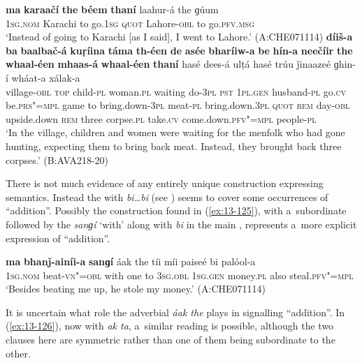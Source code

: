 \ea
\label{ex:13-123}
\gll \textbf{ma} \textbf{karaačí} \textbf{the} \textbf{béem} \textbf{thaní} laahur-á the  ɡúum \\
\textsc{1sg.nom} Karachi to go.\textsc{1sg} \textsc{quot} Lahore-\textsc{obl} to go.\textsc{pfv.msg} \\
\glt `Instead of going to Karachi [as I said], I went to Lahore.' (A:CHE071114)
\ex
\label{ex:13-124}
\gll \textbf{díiš-a} \textbf{ba} \textbf{baalbač-á} \textbf{kuṛíina} \textbf{táma} \textbf{th-éen} \textbf{de} \textbf{asée} \textbf{bharíiw-a} \textbf{be} \textbf{hín-a} \textbf{neečíir} \textbf{the} \textbf{whaal-éen} \textbf{mhaas-á} \textbf{whaal-éen} \textbf{thaní} hasé dees-á ulṭá hasé trúu ǰinaazeé ɡhin-í wháat-a xálak-a\\
village-\textsc{obl} \textsc{top} child-\textsc{pl} woman.\textsc{pl} waiting do-\textsc{3pl}
\textsc{pst} \textsc{1pl.gen} husband-\textsc{pl} go.\textsc{cv} be.\textsc{prs"=mpl} game to
bring.down-\textsc{3pl} meat-\textsc{pl} bring.down.\textsc{3pl} \textsc{quot} \textsc{rem} day-\textsc{obl} upside.down \textsc{rem} three corpse.\textsc{pl} take.\textsc{cv} come.down.\textsc{pfv"=mpl} people-\textsc{pl}\\
\glt `In the village, children and women were waiting for the menfolk who had gone hunting, expecting them to bring back meat. Instead, they brought back three corpses.' (B:AVA218-20) 
\z

 There is not much evidence of any entirely unique construction expressing  semantics. Instead the  with \textit{bi{\ldots}bi} (see ) seems to cover some occurrences of ``addition''. Possibly the construction found in (\ref{ex:13-125}), with a~subordinate  followed by the  \textit{sanɡí} `with' along with \textit{bi} in the main , represents a~more explicit expression of ``addition''. 

\begin{exe}
\ex
\label{ex:13-125}
\gll \textbf{ma} \textbf{bhanǰ-ainíi-a} \textbf{sanɡí} áak the tíi míi  paiseé bi palóol-a \\
\textsc{1sg.nom} beat-\textsc{vn"=obl} with one to \textsc{3sg.obl} \textsc{1sg.gen} money.\textsc{pl}  also steal.\textsc{pfv"=mpl} \\
\glt `Besides beating me up, he stole my money.' (A:CHE071114) 
\end{exe}

It is uncertain what role the adverbial  \textit{áak the} plays in signalling ``addition''. In (\ref{ex:13-126}), now with \textit{ak ta}, a~similar reading is possible, although the two clauses here are symmetric rather than one of them being subordinate to the other.

